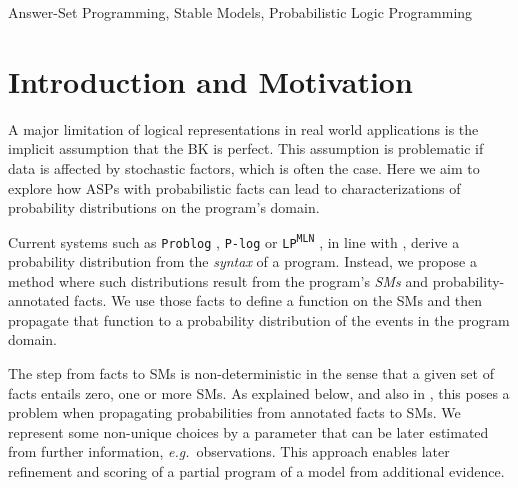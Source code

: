 \documentclass[a4paper]{article}
\renewcommand{\cite}{\citep}
\newcommand{\lpmln}{\texttt{LP\textsuperscript{MLN}}}
\begin{document}
\ifARTICLE
%
\else
\begin{keywords}
  Answer-Set Programming, Stable Models, Probabilistic Logic Programming
\end{keywords}
\fi

\section{Introduction and Motivation}

A major limitation of logical representations in real world
applications is the implicit assumption that the \acl{BK} is perfect.
This assumption is problematic if data is affected by stochastic
factors, which is often the case.  Here we aim to explore how
\aclp{ASP} with probabilistic facts can lead to characterizations of
probability distributions on the program's domain.

Current systems such as \texttt{Problog} \cite{de2007problog},
\texttt{P-log} \cite{baral2009probabilistic} or \lpmln
\cite{lee2016weighted}, in line with \cite{kifer1992theory}, derive a
probability distribution from the \textit{syntax} of a program.
%
Instead, we propose a method where such distributions result from the
program's \textit{\acp{SM}} and probability-annotated facts.  We use
those facts to define a function on the \acp{SM} and then propagate
that function to a probability distribution of the events in the
program domain.

The step from facts to \aclp{SM} is non-deterministic in the sense
that a given set of facts entails zero, one or more \acp{SM}.  As
explained below, and also in
\cite{verreet2022inference,pajunen2021solution,cozman2020joy,baral2009probabilistic},
this poses a problem when propagating probabilities from annotated
facts to \aclp{SM}.
%
We represent some non-unique choices by a parameter that can be later
estimated from further information, \emph{e.g.}\ observations.  This
approach enables later refinement and scoring of a partial program of
a model from additional evidence.
\end{document}

